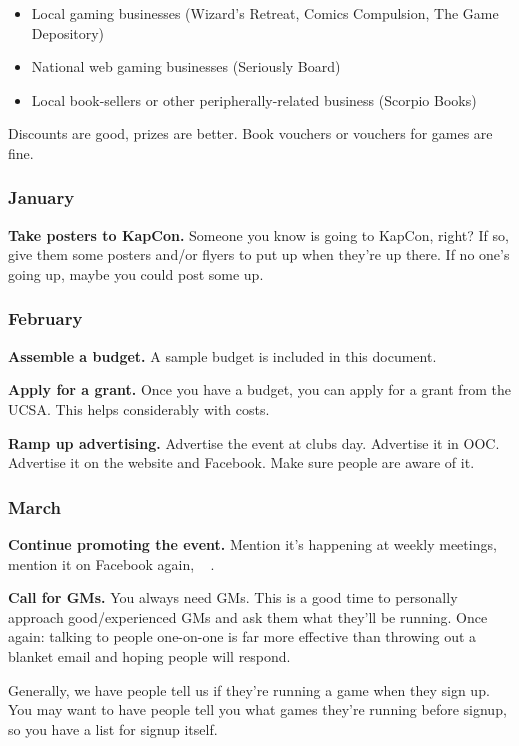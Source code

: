 \begin{itemize}
  \item Local gaming businesses (\eg Wizard's Retreat, Comics Compulsion, The Game Depository)
  \item National web gaming businesses (\eg Seriously Board)
  \item Local book-sellers or other peripherally-related business (\eg Scorpio Books)
\end{itemize}

Discounts are good, prizes are better. Book vouchers or vouchers for games are fine.

\subsubsection{January}

\textbf{Take posters to KapCon.} Someone you know is going to KapCon, right? If so, give them some posters and/or flyers to put up when they're up there. If no one's going up, maybe you could post some up.

\subsubsection{February}

\textbf{Assemble a budget.} A sample budget is included in this document.

\textbf{Apply for a grant.} Once you have a budget, you can apply for a grant from the UCSA. This helps considerably with costs.

\textbf{Ramp up advertising.} Advertise the event at clubs day. Advertise it in OOC. Advertise it on the website and Facebook. Make sure people are aware of it.

\subsubsection{March}

\textbf{Continue promoting the event.} Mention it's happening at weekly meetings, mention it on Facebook again, \etc~ \etc.

\textbf{Call for GMs.} You always need GMs. This is a good time to personally approach good/experienced GMs and ask them what they'll be running. Once again: talking to people one-on-one is far more effective than throwing out a blanket email and hoping people will respond.

Generally, we have people tell us if they're running a game when they sign up. You may want to have people tell you what games they're running before signup, so you have a list for signup itself.

